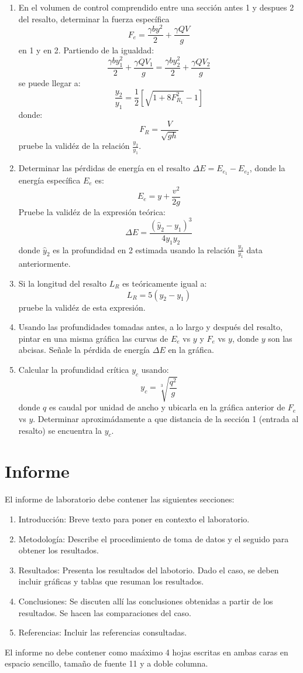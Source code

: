 \documentclass[10pt, a4paper]{exam}
\begin{document}
\begin{enumerate}
\item En el volumen de control comprendido entre una secci\'on antes 1 y  despues 2 del resalto, determinar la fuerza espec\'ifica 
$$
F_e = \frac{\gamma b y^2}{2} + \frac{\gamma Q V}{g}
$$
en 1 y en 2. Partiendo de la igualdad:
$$
\frac{\gamma b y_1^2}{2} + \frac{\gamma Q V_1}{g} = \frac{\gamma b y_2^2}{2} + \frac{\gamma Q V_2}{g}
$$
se puede llegar a: 
$$
\frac{y_2}{y_1} = \frac{1}{2}\left[ \sqrt{1+8F_{R_1}^2} -1 \right]
$$
donde:
$$
F_R = \frac{V}{\sqrt{gh}}
$$
pruebe la valid\'ez de la relaci\'on $\frac{y_2}{y_1}$.

\item Determinar las p\'erdidas de energ\'ia en el resalto $\Delta E = E_{e_1} - E_{e_2}$, donde la energ\'ia espec\'ifica $E_e$ es:
$$
E_e  = y + \frac{v^2}{2g}
$$
Pruebe la valid\'ez de la expresi\'on te\'orica:
$$
\Delta E = \frac{(\hat{y}_2 - y_1)^3}{4y_1 y_2}
$$
donde $\hat{y}_2$ es la profundidad en 2 estimada usando la relaci\'on $\frac{y_2}{y_1}$ data anteriormente.
\item Si la longitud del resalto $L_R$ es te\'oricamente igual a:
$$
L_R = 5(y_2 - y_1)
$$
pruebe la valid\'ez de esta expresi\'on.

\item Usando las profundidades tomadas antes, a lo largo y despu\'es del resalto, pintar en una misma gr\'afica las curvas de $E_e$ vs $y$ y $F_e$ vs $y$, donde $y$ son las abcisas. Se\~nale la p\'erdida de energ\'ia $\Delta E$ en la gr\'afica.

\item Calcular la profundidad cr\'itica $y_c$ usando:
$$
y_c = \sqrt[3]{\frac{q^2}{g}}
$$
donde $q$ es caudal por unidad de ancho y ubicarla en la gr\'afica anterior de $F_e$ vs $y$. Determinar aproxim\'adamente a que distancia de la secci\'on 1 (entrada al resalto) se encuentra la $y_c$.

\end{enumerate}

\section{Informe}
El informe de laboratorio debe contener las siguientes secciones: 
\begin{enumerate}
    \item Introducci\'on: Breve texto para poner en contexto el laboratorio.
    \item Metodolog\'ia: Describe el procedimiento de toma de datos y el seguido para obtener los resultados.
    \item Resultados: Presenta los resultados del labotorio. Dado el caso, se deben incluir gr\'aficas y tablas que resuman los resultados.
    \item Conclusiones: Se discuten all\'i las conclusiones obtenidas a partir de los resultados. Se hacen las comparaciones del caso.
    \item Referencias: Incluir las referencias consultadas.
\end{enumerate}
El informe no debe contener como ma\'aximo 4 hojas escritas en ambas caras en espacio sencillo, tama\~no de fuente 11 y a doble columna. 
\end{document}
